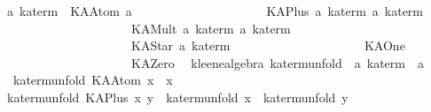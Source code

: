 \begin{isabellebody}
\endisatagproof
{\isafoldproof}%
%
\isadelimproof
\isanewline
%
\endisadelimproof
\isanewline
{}\isamarkupfalse%
\isanewline
\isanewline
{}\isamarkupfalse%
\ {}a\ ka{}term\ {}\ KAAtom\ {}a\isanewline
\ \ \ \ \ \ \ \ \ \ \ \ \ \ \ \ \ \ \ \ {}\ KAPlus\ {}{}a\ ka{}term{}\ {}{}a\ ka{}term{}\isanewline
\ \ \ \ \ \ \ \ \ \ \ \ \ \ \ \ \ \ \ \ {}\ KAMult\ {}{}a\ ka{}term{}\ {}{}a\ ka{}term{}\isanewline
\ \ \ \ \ \ \ \ \ \ \ \ \ \ \ \ \ \ \ \ {}\ KAStar\ {}{}a\ ka{}term{}\isanewline
\ \ \ \ \ \ \ \ \ \ \ \ \ \ \ \ \ \ \ \ {}\ KAOne\isanewline
\ \ \ \ \ \ \ \ \ \ \ \ \ \ \ \ \ \ \ \ {}\ KAZero\isanewline
\isanewline
{}\isamarkupfalse%
\ {}\ kleene{}algebra{}\ ka{}term{}unfold\ {}{}\ {}{}a\ ka{}term\ {}\ {}a{}\ \isanewline
\ \ {}ka{}term{}unfold\ {}KAAtom\ x{}\ {}\ x{}\isanewline
{}\ {}ka{}term{}unfold\ {}KAPlus\ x\ y{}\ {}\ {}ka{}term{}unfold\ x{}\ {}\ {}ka{}term{}unfold\ y{}{}\isanewline

\end{isabellebody}
